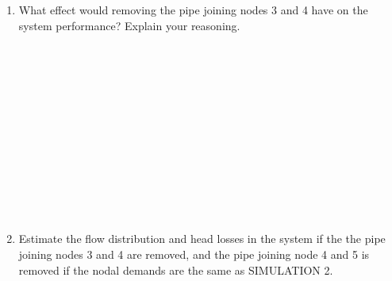 \documentclass[11pt]{article}
\begin{document}
\begin{enumerate}
\begin{enumerate}
\clearpage
\item What effect would removing the pipe joining nodes 3 and 4 have on the system performance?   Explain your reasoning.
\\
\\
\\
\\
\\
\\
\\
\\
\\
\\
\\
\\
\\
\item Estimate the flow distribution and head losses in the system if the the pipe joining nodes 3 and 4 are removed, and the pipe joining node 4 and 5 is removed if the nodal demands are the same as SIMULATION  2.
\end{enumerate} 

\begin{figure}[ht!] %
\centering


\end{figure}
\end{enumerate}
\end{document}
